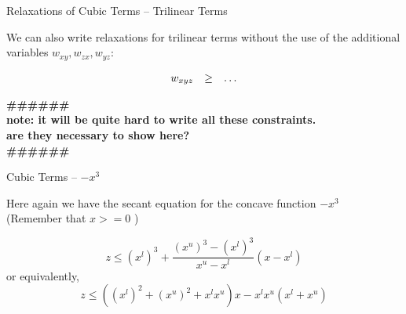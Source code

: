 \documentclass{beamer}
\newcommand{\todo}[1]
{\begin{tiny}
  \begin{center} {\color{red}
  \textbf{ {\#\#\#\hfill\#\#\#}\\{#1}\\\#\#\#\hfill\#\#\#}}
\end{center}
\end{tiny}} %
\begin{document}
\begin{frame}{Relaxations of Cubic Terms -- Trilinear Terms}

  We can also write relaxations for trilinear terms without the use of the additional
  variables $w_{xy}, w_{zx}, w_{yz}$: 

  \begin{displaymath}
    \begin{array}[<+position+>]{rcl}
      w_{xyz} & \geq & \dots
    \end{array}
  \end{displaymath}

  \todo{note: it will be quite hard to write all these constraints. \\
  are they necessary to show here?}
\end{frame}

\begin{frame}{Cubic Terms -- $-x^3$}

  Here again we have the secant equation for the concave function $-x^3$ \\
  (Remember that $x >= 0$ )

  \begin{equation}
      z \leq (x^l)^3 + \frac{( x^u )^3-( x^l )^3 }{x^u-x^l} \left(
      x - x^l \right) 
    \end{equation}
    or equivalently,
    \begin{equation}
      z \leq \left( ( x^l )^2 + ( x^u )^2 + x^l x^u \right) x 
      - x^l x^u \left( x^l + x^u \right)
    \end{equation}
    
\end{frame}
\end{document}
